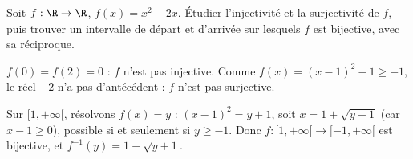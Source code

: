 \begin{exercice}[Application]
Soit $f:\R\to\R$, $f(x)=x^2-2x$. Étudier l'injectivité et la surjectivité de $f$, puis trouver un intervalle de départ et d'arrivée sur lesquels $f$ est bijective, avec sa réciproque.
\begin{correction}
$f(0)=f(2)=0$ : $f$ n'est pas injective. Comme $f(x)=(x-1)^2-1\ge-1$, le réel $-2$ n'a pas d'antécédent : $f$ n'est pas surjective.

Sur $[1,+\infty[$, résolvons $f(x)=y$ : $(x-1)^2=y+1$, soit $x=1+\sqrt{y+1}$ (car $x-1\ge0$), possible si et seulement si $y\ge-1$. Donc $f:[1,+\infty[\to[-1,+\infty[$ est bijective, et $f^{-1}(y)=1+\sqrt{y+1}$.
\end{correction}
\end{exercice}
